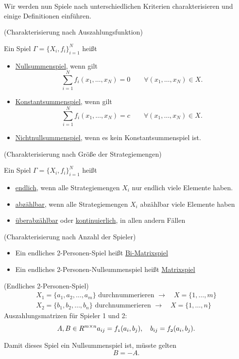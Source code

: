 Wir werden nun Spiele nach unterschiedlichen Kriterien charakterisieren und einige Definitionen einführen.

\begin{definition} (Charakterisierung nach Auszahlungsfunktion)

	Ein Spiel $\Gamma=\{X_i, f_i\}_{i=1}^N$ heißt
	\begin{itemize}
		\item \underline{Nullsummenspiel}, wenn gilt
			\[
				\sum_{i=1}^N f_i(x_1, \ldots, x_N)=0 \qquad \forall (x_1, \ldots, x_N) \in X
			.\] 
		\item \underline{Konstantsummenspiel}, wenn gilt
			\[
				\sum_{i=1}^N f_i(x_1, \ldots, x_N)=c \qquad \forall (x_1, \ldots, x_N) \in X
			.\] 
		\item \underline{Nichtnullsummenspiel}, wenn es kein Konstantsummenspiel ist.
	\end{itemize}
\end{definition}

\begin{definition} (Charakterisierung nach Größe der Strategiemengen) 

	Ein Spiel $\Gamma=\{X_i, f_i\}_{i=1}^N$ heißt
	\begin{itemize}
		\item \underline{endlich}, wenn alle Strategiemengen $X_i$ nur endlich viele Elemente haben.
		\item \underline{abzählbar}, wenn alle Strategiemengen $X_i$ abzählbar viele Elemente haben
		\item \underline{überabzählbar} oder \underline{kontinuierlich}, in allen andern Fällen
	\end{itemize}
\end{definition}

\begin{definition} (Charakterisierung nach Anzahl der Spieler)
	\begin{itemize}
		\item Ein endliches 2-Personen-Spiel heißt \underline{Bi-Matrixspiel} 
		\item Ein endliches 2-Personen-Nullsummenspiel heißt \underline{Matrixspiel} 
	\end{itemize}
\end{definition}

\begin{beispiel}
	(Endliches 2-Personen-Spiel)
	\begin{align*}
		X_1 = \{a_1, a_2, \ldots, a_m\} \text{ durchnummerieren } \rightarrow \quad X=\{1,\ldots,m\} \\
		X_2 = \{b_1, b_2, \ldots, b_n\} \text{ durchnummerieren } \rightarrow \quad X=\{1,\ldots,n\} 
	\end{align*}
Auszahlungsmatrizen für Spieler 1 und 2: \[A, B \in R^{m \times n} \mit a_{ij} = f_1(a_i, b_j), \quad b_{ij} = f_2(a_i, b_j)
.\]

Damit dieses Spiel ein Nullsummenspiel ist, müsste gelten \[
B = -A
.\] 
\end{beispiel}

